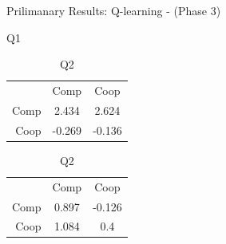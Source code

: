 \documentclass{beamer}
\begin{document}
\begin{frame}{Prilimanary Results: Q-learning - (Phase 3)}
    \begin{table}[!htb]
        \begin{minipage}{.5\linewidth}
          \caption{Q1}
          \centering
            \begin{tabular}{ r|c|c| }
                \multicolumn{1}{r}{}
                 &  \multicolumn{1}{c}{Comp}
                 & \multicolumn{1}{c}{Coop} \\
                \cline{2-3}
                Comp & 2.434 & 2.624 \\
                \cline{2-3}
                Coop & -0.269 & -0.136 \\
                \cline{2-3}
            \end{tabular}
        \end{minipage}%
        \begin{minipage}{.5\linewidth}
          \centering
            \caption{Q2}
            \begin{tabular}{ r|c|c| }
                \multicolumn{1}{r}{}
                 &  \multicolumn{1}{c}{Comp}
                 & \multicolumn{1}{c}{Coop} \\
                \cline{2-3}
                Comp & 0.897 & -0.126 \\
                \cline{2-3}
                Coop & 1.084 & 0.4 \\
                \cline{2-3}
            \end{tabular}
        \end{minipage}
    \end{table}


\end{frame}
\end{document}
